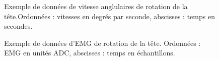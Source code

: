 \documentclass[letterpaper, twoside, 12pt, memoire, creativecommons, hyperref]{thETS}
\begin{document}
\begin{figure}
	\centering
	\caption{Exemple de données de vitesse anglulaires de rotation de la tête.Ordonnées : vitesses en degrés par seconde, abscisses : temps en secondes.}
	\label{fig:validExVit}
\end{figure}

\begin{figure}
	\centering
	\caption{Exemple de données d'EMG de rotation de la tête. Ordonnées : EMG en unités ADC, abscisses : temps en échantillons.}
	\label{fig:validExEMG}
\end{figure}
\end{document}
